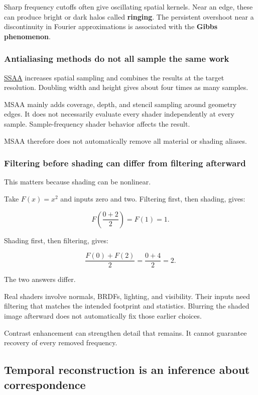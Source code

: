 Sharp frequency cutoffs often give oscillating spatial kernels. Near an edge, these can produce bright or dark halos called \textbf{ringing}. The persistent overshoot near a discontinuity in Fourier approximations is associated with the \textbf{Gibbs phenomenon}.

\subsubsection{Antialiasing methods do not all sample the same work}\label{04-visual-computing-ii-ch043-antialiasing-methods-do-not-all-sample-the-same-work}

\hyperref[appendix-4192b2bdd21e]{SSAA} increases spatial sampling and combines the results at the target resolution. Doubling width and height gives about four times as many samples.

MSAA mainly adds coverage, depth, and stencil sampling around geometry edges. It does not necessarily evaluate every shader independently at every sample. Sample-frequency shader behavior affects the result.

MSAA therefore does not automatically remove all material or shading aliases.

\subsubsection{Filtering before shading can differ from filtering afterward}\label{04-visual-computing-ii-ch043-filtering-before-shading-can-differ-from-filtering-afterward}

This matters because shading can be nonlinear.

Take \(F(x)=x^2\) and inputs zero and two. Filtering first, then shading, gives:

\[
F\left(\frac{0+2}{2}\right)=F(1)=1.
\]

Shading first, then filtering, gives:

\[
\frac{F(0)+F(2)}2=\frac{0+4}2=2.
\]

The two answers differ.

Real shaders involve normals, BRDFs, lighting, and visibility. Their inputs need filtering that matches the intended footprint and statistics. Blurring the shaded image afterward does not automatically fix those earlier choices.

Contrast enhancement can strengthen detail that remains. It cannot guarantee recovery of every removed frequency.

\subsection{Temporal reconstruction is an inference about correspondence}\label{04-visual-computing-ii-ch043-temporal-reconstruction-is-an-inference-about-correspondence}


